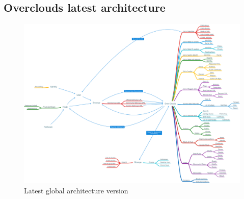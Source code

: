 
\subsection{Overclouds latest architecture}

\begin{figure}[htpb]
\centering
\begin{adjustbox}{center}
\includegraphics[scale=0.21]{annexes/architecture/Overclouds-Architecture-Draft-2-Latest.png}
\end{adjustbox}
\caption{Latest global architecture version
\label{img:latest-architecture}}  
\end{figure}


